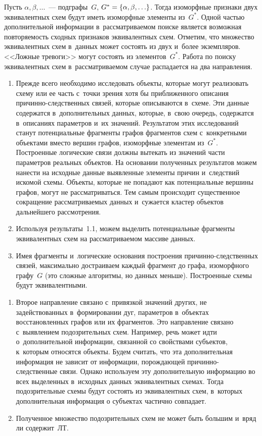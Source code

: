 \begin{multicols}{2}
  Пусть $\alpha, \beta, \ldots$~--- подграфы~$G$, $G^*\hm= \{\alpha, \beta, 
\ldots\}$. Тогда изоморфные признаки двух эквивалентных схем будут иметь 
изоморфные элементы из~$G^*$. Одной частью дополнительной информации 
в~рассматриваемом поиске является возможная повторяемость сходных признаков 
эквивалентных схем. Отметим, что множество эквивалентных схем в~данных 
может состоять из двух и~более экземпляров. <<Лож\-ные тревоги>> могут состоять из 
элементов~$G^*$. Работа по поиску эквивалентных схем в~рассматриваемом 
случае распадается на два направления.
  \begin{enumerate}[{1}.1]
  
  \item  Прежде всего необходимо исследовать объекты, которые могут 
реализовать схему или ее часть с~точки зрения хотя бы приближенного описания  
при\-чин\-но-след\-ст\-вен\-ных связей, которые описываются в~схеме. Эти данные 
содержатся в~дополнительных данных, которые, в~свою очередь, содержатся 
в~описаниях параметров и~их значений. Результатом этих исследований станут 
потенциальные фрагменты графов фрагментов схем с~конкретными объектами 
вместо вершин графов, изоморфные элементам из~$G^*$. Построенные 
логические связи должны вытекать из значений части параметров реальных 
объектов. На основании полученных результатов можем нанести на исходные 
данные выявленные элементы причин и~следствий искомой схемы. Объекты, 
которые не попадают как потенциальные вершины графов, могут не 
рассматриваться. Тем самым происходит существенное сокращение 
рассматриваемых данных и~сужается кластер объектов дальнейшего 
рассмотрения.
  \item  Используя результаты~1.1, можем выделить потенциальные фрагменты 
эквивалентных схем на рас\-смат\-ри\-ва\-емом массиве данных.
  \item  Имея фрагменты и~логические основания построения 
  причинно-следственных связей, максимально достраиваем каждый фрагмент до графа, 
изоморфного графу~$G$ (это сложные алгоритмы, но данных меньше). 
Построенные схемы будут эквивалентными.
  \end{enumerate}
  \begin{enumerate}[{2}.1]
  \item Второе направление связано с~привязкой значений других, не 
задействованных в~формировании дуг, параметров в~объектах восстановленных 
графов или их фрагментов. Это направление связано с~выявлением 
подозрительных схем. Например, речь может идти о~дополнительной 
информации, связанной со свойствами субъектов, к~которым относятся объекты. 
Будем считать, что эта дополнительная информация не зависит от информации, 
порождающей при\-чин\-но-след\-ст\-вен\-ные связи. Однако используем эту 
дополнительную информацию во всех выделенных в~исходных данных 
эквивалентных схемах. Тогда подозрительные схемы будут состоять из 
эквивалентных схем, в~которых дополнительная информация о субъектах 
частично совпадает.
  \item  Полученное множество подозрительных схем не может быть большим 
и~вряд ли со\-дер\-жит~ЛТ.
  \end{enumerate}
  

\end{multicols}
